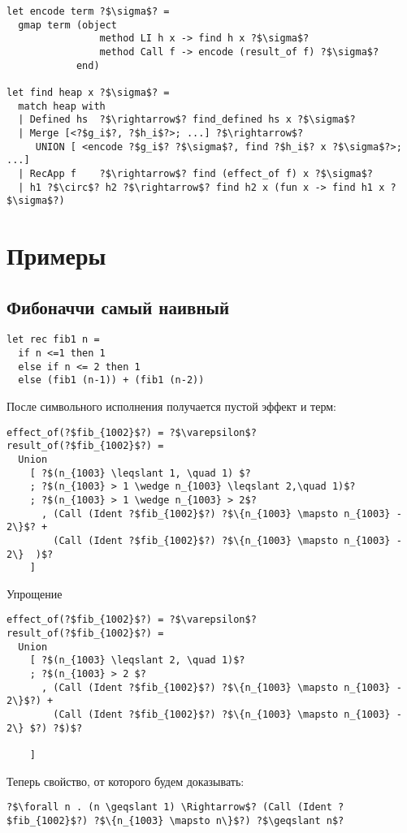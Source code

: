 \documentclass{article}
\begin{document}
\begin{verbatim}  
let encode term ?$\sigma$? = 
  gmap term (object 
                method LI h x -> find h x ?$\sigma$? 
                method Call f -> encode (result_of f) ?$\sigma$? 
            end)

let find heap x ?$\sigma$? =
  match heap with 
  | Defined hs  ?$\rightarrow$? find_defined hs x ?$\sigma$? 
  | Merge [<?$g_i$?, ?$h_i$?>; ...] ?$\rightarrow$? 
     UNION [ <encode ?$g_i$? ?$\sigma$?, find ?$h_i$? x ?$\sigma$?>; ...]
  | RecApp f    ?$\rightarrow$? find (effect_of f) x ?$\sigma$?
  | h1 ?$\circ$? h2 ?$\rightarrow$? find h2 x (fun x -> find h1 x ?$\sigma$?)
\end{verbatim}

\section{Примеры}
\subsection{Фибоначчи самый наивный}
\begin{verbatim}  
let rec fib1 n = 
  if n <=1 then 1
  else if n <= 2 then 1
  else (fib1 (n-1)) + (fib1 (n-2))
\end{verbatim}

После символьного исполнения получается пустой эффект и терм:
\begin{verbatim}
effect_of(?$fib_{1002}$?) = ?$\varepsilon$?
result_of(?$fib_{1002}$?) = 
  Union 
    [ ?$(n_{1003} \leqslant 1, \quad 1) $?
    ; ?$(n_{1003} > 1 \wedge n_{1003} \leqslant 2,\quad 1)$?
    ; ?$(n_{1003} > 1 \wedge n_{1003} > 2$?
      , (Call (Ident ?$fib_{1002}$?) ?$\{n_{1003} \mapsto n_{1003} - 2\}$? +
        (Call (Ident ?$fib_{1002}$?) ?$\{n_{1003} \mapsto n_{1003} - 2\}  )$?   
    ]
\end{verbatim}
Упрощение
\begin{verbatim}
effect_of(?$fib_{1002}$?) = ?$\varepsilon$?
result_of(?$fib_{1002}$?) = 
  Union 
    [ ?$(n_{1003} \leqslant 2, \quad 1)$?
    ; ?$(n_{1003} > 2 $?
      , (Call (Ident ?$fib_{1002}$?) ?$\{n_{1003} \mapsto n_{1003} - 2\}$?) +
        (Call (Ident ?$fib_{1002}$?) ?$\{n_{1003} \mapsto n_{1003} - 2\} $?) ?$)$?

    ]
\end{verbatim}
Теперь свойство, от которого будем доказывать: 
\begin{verbatim}
?$\forall n . (n \geqslant 1) \Rightarrow$? (Call (Ident ?$fib_{1002}$?) ?$\{n_{1003} \mapsto n\}$?) ?$\geqslant n$?
\end{verbatim}
\end{document}
